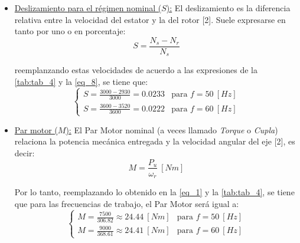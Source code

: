 \documentclass[12pt,a4paper]{article}
\begin{document}
\begin{itemize}
    Se verifica que esto es cierto ya que observando la parte superior derecha de la \autoref{fig:fig_1}, se indica que el motor a analizar sigue tal normativa. Por lo tanto, la velocidad del estator para las dos frecuencias de trabajo que lista la placa de la \autoref{fig:fig_1}, serán iguales a:
    \begin{equation}
        \begin{cases}
            N_{s} = \frac{60(50)}{1} = 3000 \ [rpm] & \text{para $f = 50 \ [Hz]$} \\[5pt]
            N_{s} = \frac{60(60)}{1} = 3600 \ [rpm] & \text{para $f = 60 \ [Hz]$} \\
        \end{cases}
        \label{eq_8}
    \end{equation}



    \item \underline{Deslizamiento para el régimen nominal ($S$):} El deslizamiento es la diferencia relativa entre la velocidad del estator y la del rotor [2]. Suele expresarse en tanto por uno o en porcentaje:
    \begin{equation}
        S = \frac{N_{s} - N_{r}}{N_{s}}
        \label{eq_9}
    \end{equation}

    reemplanzando estas velocidades de acuerdo a las expresiones de la \autoref{tab:tab_4} y la \autoref{eq_8}, se tiene que:
    \begin{equation}
        \begin{cases}
            S = \frac{3000 - 2930}{3000} = 0.0233  & \text{para $f = 50 \ [Hz]$} \\[5pt]
            S = \frac{3600 - 3520}{3600} = 0.0222  & \text{para $f = 60 \ [Hz]$}
        \end{cases}
        \label{eq_10}
    \end{equation}

    

    \item \underline{Par motor ($M$):} El Par Motor nominal (a veces llamado \textit{Torque} o \textit{Cupla}) relaciona la potencia mecánica entregada y la velocidad angular del eje [2], es decir:
    \begin{equation}
        M = \frac{P_{u}}{\omega_{r}} \ [Nm]
        \label{eq_11}
    \end{equation}

    Por lo tanto, reemplazando lo obtenido en la \autoref{eq_1} y la \autoref{tab:tab_4}, se tiene que para las frecuencias de trabajo, el Par Motor será igual a:
    \begin{equation}
        \begin{cases}
            M = \frac{7500}{306.82} \approx 24.44 \ [Nm] & \text{para $f = 50 \ [Hz]$} \\[5pt]
            M = \frac{9000}{368.61} \approx 24.41 \ [Nm] & \text{para $f = 60 \ [Hz]$} 
        \end{cases}
        \label{eq_12}
    \end{equation}




\end{itemize}
\end{document}

